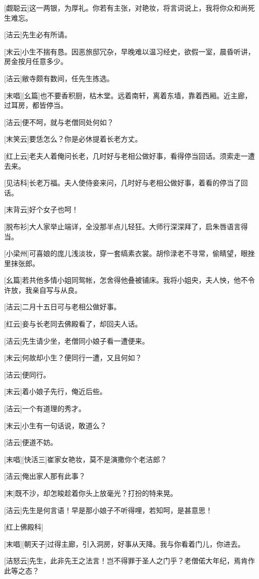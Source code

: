 \documentclass{book}
\begin{document}
[觑聪云]这一两银，为厚礼。你若有主张，对艳妆，将言词说上，我将你众和尚死生难忘。

[洁云]先生必有所请。

[末云]小生不揣有恳。因恶旅邸冗杂，早晚难以温习经史，欲假一室，晨昏听讲，房金按月任意多少。

[洁云]敝寺颇有数间，任先生拣选。

[末唱][幺篇]也不要香积厨，枯木堂。远着南轩，离着东墙，靠着西厢。近主廊，过耳房，都皆停当。

[洁云]便不呵，就与老僧同处何如？

[末笑云]要恁怎么？你是必休提着长老方丈。

[红上云]老夫人着俺问长老，几时好与老相公做好事，看得停当回话。须索走一遭去来。

[见洁科]长老万福。夫人使侍妾来问，几时好与老相公做好事，着看的停当了回话。

[末背云]好个女子也呵！

[脱布衫]大人家举止端详，全没那半点儿轻狂。大师行深深拜了，启朱唇语言得当。

[小梁州]可喜娘的庞儿浅淡妆，穿一套缟素衣裳。胡伶渌老不寻常，偷睛望，眼挫里抹张郎。

[幺篇]若共他多情小姐同鸳帐，怎舍得他叠被铺床。我将小姐央，夫人怏，他不令许放，我亲自写与从良。

[洁云]二月十五日可与老相公做好事。

[红云]妾与长老同去佛殿看了，却回夫人话。

[洁云]先生请少坐，老僧同小娘子看一遭便来。

[末云]何故却小生？便同行一遭，又且何如？

[洁云]便同行。

[末云]着小娘子先行，俺近后些。

[洁云]一个有道理的秀才。

[末云]小生有一句话说，敢道么？

[洁云]便道不妨。

[末唱][快活三]崔家女艳妆，莫不是演撒你个老洁郎？

[洁云]俺出家人那有此事？

[末]既不沙，却怎睃趁着你头上放毫光？打扮的特来晃。

[洁云]先生是何言语！早是那小娘子不听得哩，若知呵，是甚意思！

[红上佛殿科]

[末唱][朝天子]过得主廊，引入洞房，好事从天降。我与你看着门儿，你进去。

[洁怒云]先生，此非先王之法言！岂不得罪于圣人之门乎？老僧偌大年纪，焉肯作此等之态？
\end{document}
